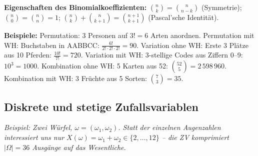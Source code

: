 \textbf{Eigenschaften des Binomialkoeffizienten:} $\binom{n}{k} = \binom{n}{n-k}$ (Symmetrie); $\binom{n}{0} = \binom{n}{n} = 1$; $\binom{n}{k} + \binom{n}{k+1} = \binom{n+1}{k+1}$ (Pascal'sche Identität).

\textbf{Beispiele:}
Permutation: 3 Personen auf $3! = 6$ Arten anordnen.
Permutation mit WH: Buchstaben in AABBCC: $\frac{6!}{2!\cdot2!\cdot2!} = 90$.
Variation ohne WH: Erste 3 Plätze aus 10 Pferden: $\frac{10!}{7!} = 720$.
Variation mit WH: 3-stellige Codes aus Ziffern 0--9: $10^3 = 1000$.
Kombination ohne WH: 5 Karten aus 52: $\binom{52}{5} = 2\,598\,960$.
Kombination mit WH: 3 Früchte aus 5 Sorten: $\binom{7}{3} = 35$.

\newpage

\subsection{Diskrete und stetige Zufallsvariablen}


\textit{Beispiel: Zwei Würfel, $\omega = (\omega_1, \omega_2)$. Statt der einzelnen Augenzahlen interessiert uns nur $X(\omega) = \omega_1 + \omega_2 \in \{2,\ldots,12\}$ -- die ZV komprimiert $|\Omega|=36$ Ausgänge auf das Wesentliche.}

